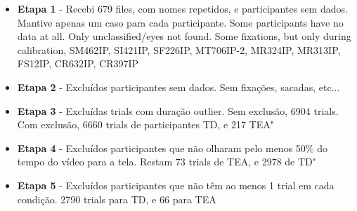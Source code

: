 \documentclass{article}
\begin{document}
\begin{itemize}
  \item \textbf{Etapa 1} - Recebi 679 files, com nomes repetidos, e participantes sem dados. Mantive apenas um caso para cada participante. Some participants have no data at all. Only unclassified/eyes not found. Some fixations, but only during calibration, SM462IP, SI421IP, SF226IP, MT706IP-2, MR324IP, MR313IP, FS12IP, CR632IP, CR397IP
  \item \textbf{Etapa 2} - Excluídos participantes sem dados. Sem fixações, sacadas, etc...
  \item \textbf{Etapa 3} - Excluídas trials com duração outlier. Sem exclusão, 6904 trials. Com exclusão, 6660 trials de participantes TD, e 217 TEA"
  \item \textbf{Etapa 4} - Excluídos participantes que não olharam pelo menos 50\% do tempo do vídeo para a tela. Restam 73 trials de TEA, e 2978 de TD"
  \item \textbf{Etapa 5} - Excluídos participantes que não têm ao menos 1 trial em cada condição. 2790 trials para TD, e 66 para TEA
\end{itemize}
\end{document}
